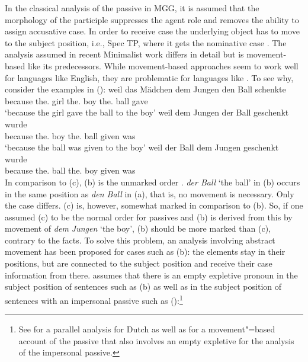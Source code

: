 \documentclass[output=paper
                ,modfonts
                ,nonflat
	        ,collection
	        ,collectionchapter
	        ,collectiontoclongg
 	        ,biblatex
                ,babelshorthands
                ,newtxmath
                ,draftmode
                ,colorlinks, citecolor=brown
]{./langsci/langscibook}
\begin{document}
In the classical analysis of the passive in MGG, it is assumed that the morphology of the participle suppresses
the agent role and removes the ability to assign accusative case. In order to receive case the
underlying object has to move to the subject position, i.e., Spec TP, where it gets the nominative case \citep[]{Chomsky81a}.
\eal
{}
\zl
The analysis assumed in recent Minimalist work differs in detail but is movement-based like its
predecessors. While movement-based approaches seem to work well for  languages like English, they
are problematic for  languages like . To see why, consider the examples in ():
\eal
\label{ex-passive-German-no-movement}
\ex 
\gll weil das Mädchen dem Jungen den Ball schenkte\\
     because the.\nom{} girl the.\dat{} boy the.\acc{} ball gave\\
\glt `because the girl gave the ball to the boy'
\ex 
\gll weil dem Jungen der Ball geschenkt wurde\\
	 because the.\dat{} boy the.\nom{} ball given was\\
\glt `because the ball was given to the boy'
\ex 
\gll weil der Ball dem Jungen geschenkt wurde\\
     because the.\nom{} ball the.\dat{} boy given was\\
\zl
In comparison to (c), (b) is the unmarked order \citep{Hoehle82a}. \emph{der Ball} `the ball' in (b) occurs
in the same position as \emph{den Ball} in (a), that is, no movement is necessary. Only the case differs.
(c) is, however, somewhat marked in comparison to (b). So, if one assumed (c) to
be the normal order for passives and (b) is derived from this by movement of \emph{dem
  Jungen} `the boy', (b) should be more marked than (c), contrary to the facts. To
solve this problem, an analysis involving abstract movement has been proposed for
cases such as (b): the elements stay in their positions, but are connected to
the subject position and receive their case information from there. \citet[]{Grewendorf93}
assumes that there is an empty expletive pronoun
in the subject position of sentences such as (b) as well as in the subject position of sentences with an
impersonal passive such as ():\footnote{%
	See  for a parallel analysis for Dutch as well as 
	 for a movement"=based account of the passive that also involves an
        empty expletive for the analysis of the impersonal passive.
}
\end{document}
